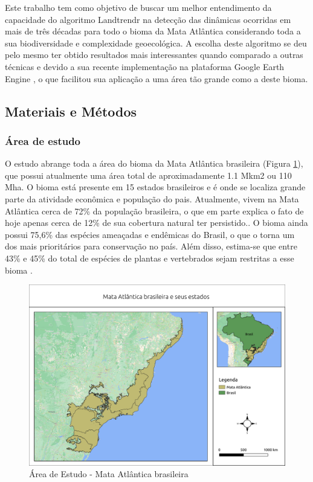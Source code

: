 Este trabalho tem como objetivo de buscar um melhor entendimento da capacidade do algoritmo Landtrendr na detecção das dinâmicas ocorridas em mais de três décadas para todo o bioma da Mata Atlântica considerando toda a sua biodiversidade e complexidade geoecológica. A escolha deste algoritmo se deu pelo mesmo ter obtido resultados mais interessantes quando comparado a outras técnicas \citep{Saxena2018} e devido a sua recente implementação na plataforma Google Earth Engine \citep{Kennedy2018}, o que facilitou sua aplicação a uma área tão grande como a deste bioma. 

\subsection{Materiais e Métodos}
\subsubsection{Área de estudo}
\hspace{13pt} O estudo abrange toda a área do bioma da Mata Atlântica brasileira (Figura \ref{fig:mata_atlantica}), que possui atualmente uma área total de aproximadamente 1.1 Mkm2 ou 110 Mha. O bioma está presente em 15 estados brasileiros e é onde se localiza grande parte da atividade econômica e população do pais. Atualmente, vivem na Mata Atlântica cerca de 72\% da população brasileira, o que em parte explica o fato de hoje apenas cerca de 12\% de sua cobertura natural ter persistido.. O bioma ainda possui 75,6\% das espécies ameaçadas e endêmicas do Brasil, o que o torna um dos mais prioritários para conservação no país. Além disso, estima-se que entre 43\% e 45\% do total de espécies de plantas e vertebrados sejam restritas a esse bioma \citep{scarano2014}.

\begin{figure}[h!]
    \centering
    \includegraphics[scale=.5]{images/mata_atlantica.png}
    \caption{Área de Estudo - Mata Atlântica brasileira}
    \label{fig:mata_atlantica}
\end{figure}

